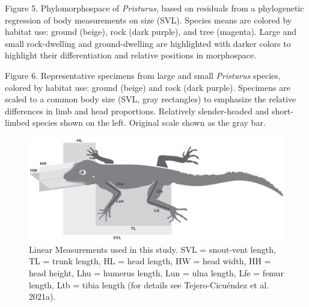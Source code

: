 \documentclass[
  11pt,
]{article}
\begin{document}
Figure 5. Phylomorphospace of \emph{Pristurus}, based on residuals from
a phylogenetic regression of body measurements on size (SVL). Species
means are colored by habitat use: ground (beige), rock (dark purple),
and tree (magenta). Large and small rock-dwelling and ground-dwelling
are highlighted with darker colors to highlight their differentiation
and relative positions in morphospace.

Figure 6. Representative specimens from large and small
\textit{Pristurus} species, colored by habitat use: ground (beige) and
rock (dark purple). Specimens are scaled to a common body size (SVL,
gray rectangles) to emphasize the relative differences in limb and head
proportions. Relatively slender-headed and short-limbed species shown on
the left. Original scale shown as the gray bar.

\newpage

\begin{figure}

{\centering \includegraphics[width=1\linewidth]{Figs/Fig1} 

}

\caption{Linear Measurements used in this study. SVL = snout-vent length, TL = trunk length, HL = head length, HW = head width, HH = head height, Lhu = humerus length, Lun = ulna length, Lfe = femur length, Ltb = tibia length (for details see Tejero-Cicu{\'{e}}ndez et al. 2021a).}\label{fig:unnamed-chunk-4}
\end{figure}

\newpage
\end{document}
